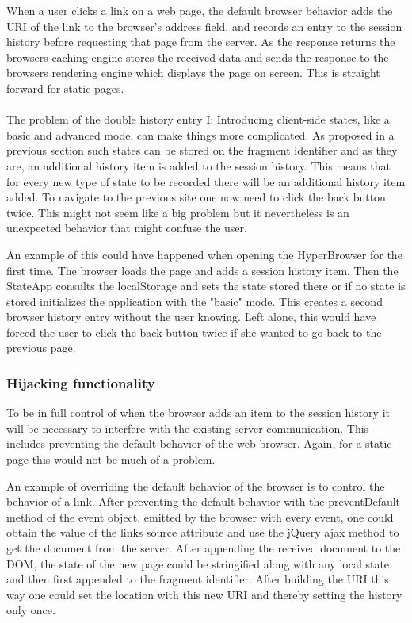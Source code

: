\documentclass[english]{ifimaster}
\begin{document}
When a user clicks a link on a web page, the default browser behavior adds the URI of the link to the browser's address field, and records an entry to the session history before requesting that page from the server. As the response returns the browsers caching engine stores the received data and sends the response to the browsers rendering engine which displays the page on screen. This is straight forward for static pages.

\paragraph{}The problem of the double history entry I:
Introducing client-side states, like a basic and advanced mode, can make things more complicated. As proposed in a previous section such states can be stored on the fragment identifier and as they are, an additional history item is added to the session history. This means that for every new type of state to be recorded there will be an additional history item added. To navigate to the previous site one now need to click the back button twice. This might not seem like a big problem but it nevertheless is an unexpected behavior that might confuse the user. 


An example of this could have happened when opening the HyperBrowser for the first time. The browser loads the page and adds a session history item. Then the StateApp consults the localStorage and sets the state stored there or if no state is stored initializes the application with the "basic" mode. This creates a second browser history entry without the user knowing. Left alone, this would have forced the user to click the back button twice if she wanted to go back to the previous page.  

\subsubsection{Hijacking functionality}
To be in full control of when the browser adds an item to the session history it will be necessary to interfere with the existing server communication. This includes preventing the default behavior of the web browser. Again, for a static page this would not be much of a problem. 

An example of overriding the default behavior of the browser is to control the behavior of a link. After preventing the default behavior with the preventDefault method of the event object, emitted by the browser with every event, one could obtain the value of the links source attribute and use the jQuery ajax method to get the document from the server. After appending the received document to the DOM, the state of the new page could be stringified along with any local state and then first appended to the fragment identifier. After building the URI this way one could set the location with this new URI and thereby setting the history only once. 
\end{document}
